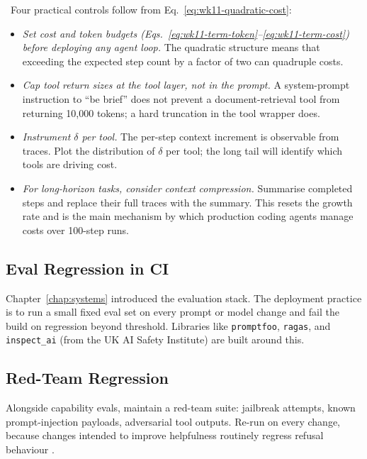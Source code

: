 \Cons\ Four practical controls follow from
Eq.~\eqref{eq:wk11-quadratic-cost}:
\begin{itemize}
  \item \emph{Set cost and token budgets
        (Eqs.~\eqref{eq:wk11-term-token}--\eqref{eq:wk11-term-cost})
        before deploying any agent loop.} The quadratic
        structure means that exceeding the expected step count
        by a factor of two can quadruple costs.
  \item \emph{Cap tool return sizes at the tool layer, not
        in the prompt.} A system-prompt instruction to ``be
        brief'' does not prevent a document-retrieval tool from
        returning 10,000 tokens; a hard truncation in the tool
        wrapper does.
  \item \emph{Instrument $\delta$ per tool.} The per-step
        context increment is observable from traces. Plot the
        distribution of $\delta$ per tool; the long tail will
        identify which tools are driving cost.
  \item \emph{For long-horizon tasks, consider context
        compression.} Summarise completed steps and replace
        their full traces with the summary. This resets the
        growth rate and is the main mechanism by which
        production coding agents manage costs over
        100-step runs.
\end{itemize}

\subsection{Eval Regression in CI}

Chapter~\ref{chap:systems} introduced the evaluation stack. The deployment practice
is to run a small fixed eval set on every prompt or model change
and fail the build on regression beyond threshold. Libraries like
\texttt{promptfoo}, \texttt{ragas}, and \texttt{inspect\_ai}
(from the UK AI Safety Institute) are built around this.

\subsection{Red-Team Regression}

Alongside capability evals, maintain a red-team suite: jailbreak
attempts, known prompt-injection payloads, adversarial tool
outputs. Re-run on every change, because changes intended to
improve helpfulness routinely regress refusal behaviour
\citep{wei2023jailbroken, zou2023universal}.

